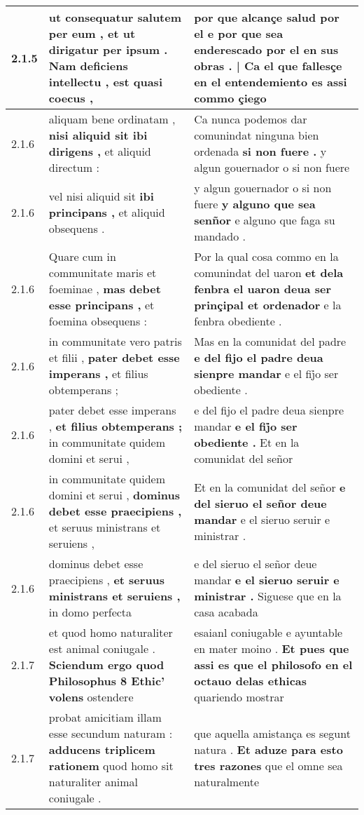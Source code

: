 \begin{tabular}{|p{1cm}|p{6.5cm}|p{6.5cm}|}
2.1.5 & ut consequatur salutem per eum , \textbf{ et ut dirigatur per ipsum . Nam deficiens intellectu , } est quasi coecus , & por que alcançe salud por el \textbf{ e por que sea enderescado por el en sus obras . | Ca el que fallesçe en el entendemiento es } assi commo çiego \\\hline
2.1.6 & aliquam bene ordinatam , \textbf{ nisi aliquid sit ibi dirigens , } et aliquid directum : & Ca nunca podemos dar comunindat ninguna bien ordenada \textbf{ si non fuere . } y algun gouernador o si non fuere \\\hline
2.1.6 & vel nisi aliquid sit \textbf{ ibi principans , } et aliquid obsequens . & y algun gouernador o si non fuere \textbf{ y alguno que sea senñor } e alguno que faga su mandado . \\\hline
2.1.6 & Quare cum in communitate maris et foeminae , \textbf{ mas debet esse principans , } et foemina obsequens : & Por la qual cosa commo en la comunindat del uaron \textbf{ et dela fenbra el uaron deua ser prinçipal et ordenador } e la fenbra obediente . \\\hline
2.1.6 & in communitate vero patris et filii , \textbf{ pater debet esse imperans , } et filius obtemperans ; & Mas en la comunidat del padre \textbf{ e del fijo el padre deua sienpre mandar } e el fij̉o ser obediente . \\\hline
2.1.6 & pater debet esse imperans , \textbf{ et filius obtemperans ; } in communitate quidem domini et serui , & e del fijo el padre deua sienpre mandar \textbf{ e el fij̉o ser obediente . } Et en la comunidat del señor \\\hline
2.1.6 & in communitate quidem domini et serui , \textbf{ dominus debet esse praecipiens , } et seruus ministrans et seruiens , & Et en la comunidat del señor \textbf{ e del sieruo el señor deue mandar } e el sieruo seruir e ministrar . \\\hline
2.1.6 & dominus debet esse praecipiens , \textbf{ et seruus ministrans et seruiens , } in domo perfecta & e del sieruo el señor deue mandar \textbf{ e el sieruo seruir e ministrar . } Siguese que en la casa acabada \\\hline
2.1.7 & et quod homo naturaliter est animal coniugale . \textbf{ Sciendum ergo quod Philosophus 8 Ethic’ volens } ostendere & esaianl coniugable e ayuntable en mater moino . \textbf{ Et pues que assi es que el philosofo en el octauo delas ethicas } quariendo mostrar \\\hline
2.1.7 & probat amicitiam illam esse secundum naturam : \textbf{ adducens triplicem rationem } quod homo sit naturaliter animal coniugale . & que aquella amistança es segunt natura . \textbf{ Et aduze para esto tres razones } que el omne sea naturalmente \\\hline

\end{tabular}
